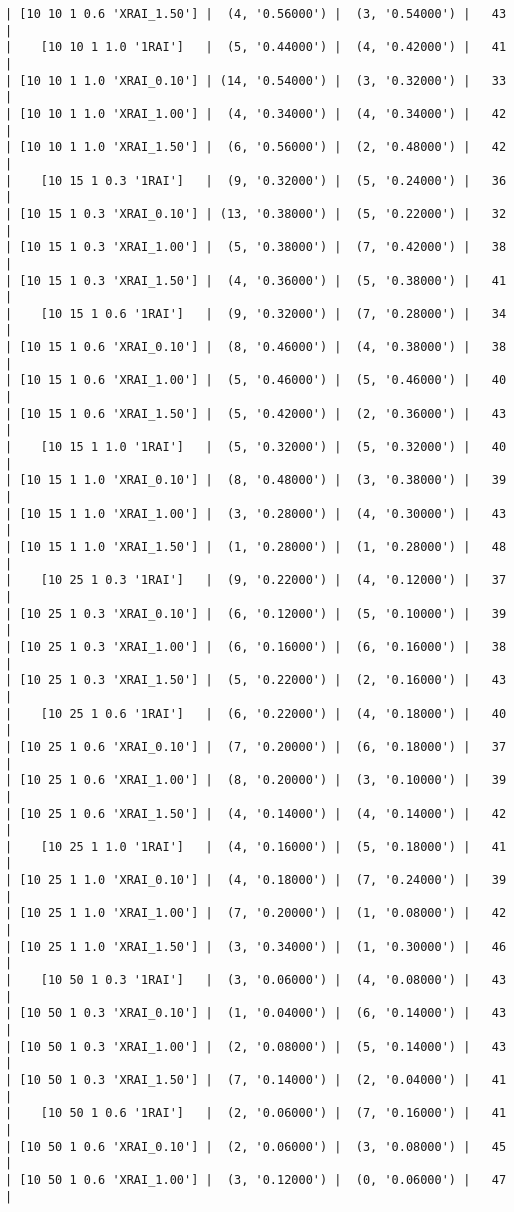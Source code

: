 \documentclass{article}
\begin{document}
\begin{verbatim}
| [10 10 1 0.6 'XRAI_1.50'] |  (4, '0.56000') |  (3, '0.54000') |   43  |
|    [10 10 1 1.0 '1RAI']   |  (5, '0.44000') |  (4, '0.42000') |   41  |
| [10 10 1 1.0 'XRAI_0.10'] | (14, '0.54000') |  (3, '0.32000') |   33  |
| [10 10 1 1.0 'XRAI_1.00'] |  (4, '0.34000') |  (4, '0.34000') |   42  |
| [10 10 1 1.0 'XRAI_1.50'] |  (6, '0.56000') |  (2, '0.48000') |   42  |
|    [10 15 1 0.3 '1RAI']   |  (9, '0.32000') |  (5, '0.24000') |   36  |
| [10 15 1 0.3 'XRAI_0.10'] | (13, '0.38000') |  (5, '0.22000') |   32  |
| [10 15 1 0.3 'XRAI_1.00'] |  (5, '0.38000') |  (7, '0.42000') |   38  |
| [10 15 1 0.3 'XRAI_1.50'] |  (4, '0.36000') |  (5, '0.38000') |   41  |
|    [10 15 1 0.6 '1RAI']   |  (9, '0.32000') |  (7, '0.28000') |   34  |
| [10 15 1 0.6 'XRAI_0.10'] |  (8, '0.46000') |  (4, '0.38000') |   38  |
| [10 15 1 0.6 'XRAI_1.00'] |  (5, '0.46000') |  (5, '0.46000') |   40  |
| [10 15 1 0.6 'XRAI_1.50'] |  (5, '0.42000') |  (2, '0.36000') |   43  |
|    [10 15 1 1.0 '1RAI']   |  (5, '0.32000') |  (5, '0.32000') |   40  |
| [10 15 1 1.0 'XRAI_0.10'] |  (8, '0.48000') |  (3, '0.38000') |   39  |
| [10 15 1 1.0 'XRAI_1.00'] |  (3, '0.28000') |  (4, '0.30000') |   43  |
| [10 15 1 1.0 'XRAI_1.50'] |  (1, '0.28000') |  (1, '0.28000') |   48  |
|    [10 25 1 0.3 '1RAI']   |  (9, '0.22000') |  (4, '0.12000') |   37  |
| [10 25 1 0.3 'XRAI_0.10'] |  (6, '0.12000') |  (5, '0.10000') |   39  |
| [10 25 1 0.3 'XRAI_1.00'] |  (6, '0.16000') |  (6, '0.16000') |   38  |
| [10 25 1 0.3 'XRAI_1.50'] |  (5, '0.22000') |  (2, '0.16000') |   43  |
|    [10 25 1 0.6 '1RAI']   |  (6, '0.22000') |  (4, '0.18000') |   40  |
| [10 25 1 0.6 'XRAI_0.10'] |  (7, '0.20000') |  (6, '0.18000') |   37  |
| [10 25 1 0.6 'XRAI_1.00'] |  (8, '0.20000') |  (3, '0.10000') |   39  |
| [10 25 1 0.6 'XRAI_1.50'] |  (4, '0.14000') |  (4, '0.14000') |   42  |
|    [10 25 1 1.0 '1RAI']   |  (4, '0.16000') |  (5, '0.18000') |   41  |
| [10 25 1 1.0 'XRAI_0.10'] |  (4, '0.18000') |  (7, '0.24000') |   39  |
| [10 25 1 1.0 'XRAI_1.00'] |  (7, '0.20000') |  (1, '0.08000') |   42  |
| [10 25 1 1.0 'XRAI_1.50'] |  (3, '0.34000') |  (1, '0.30000') |   46  |
|    [10 50 1 0.3 '1RAI']   |  (3, '0.06000') |  (4, '0.08000') |   43  |
| [10 50 1 0.3 'XRAI_0.10'] |  (1, '0.04000') |  (6, '0.14000') |   43  |
| [10 50 1 0.3 'XRAI_1.00'] |  (2, '0.08000') |  (5, '0.14000') |   43  |
| [10 50 1 0.3 'XRAI_1.50'] |  (7, '0.14000') |  (2, '0.04000') |   41  |
|    [10 50 1 0.6 '1RAI']   |  (2, '0.06000') |  (7, '0.16000') |   41  |
| [10 50 1 0.6 'XRAI_0.10'] |  (2, '0.06000') |  (3, '0.08000') |   45  |
| [10 50 1 0.6 'XRAI_1.00'] |  (3, '0.12000') |  (0, '0.06000') |   47  |

\end{verbatim}
\end{document}
